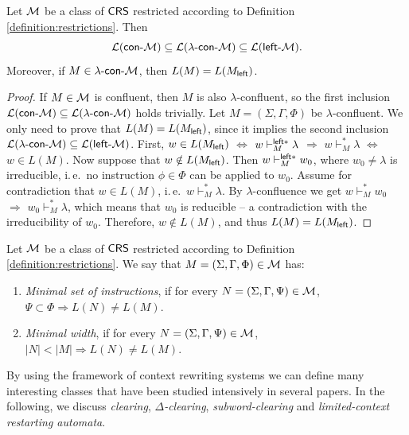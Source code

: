 \begin{lemma}\label{lemma:lambda}
Let $\textup{\sf $\mathcal{M}$}$ be a class of $\textup{\sf CRS\/}$ restricted according to Definition \ref{definition:restrictions}. Then $${\cal L}(\textup{\sf con-\textup{\sf $\mathcal{M}$}}) \subseteq {\cal L}(\textup{\sf $\lambda$-con-\textup{\sf $\mathcal{M}$}}) \subseteq {\cal L}(\textup{\sf left-\textup{\sf $\mathcal{M}$}}).$$
Moreover, if $M \in \textup{\sf $\lambda$-con-\textup{\sf $\mathcal{M}$}}$, then $L(M) = L(M_{\sf left})$.
\end{lemma}

\begin{proof}
If $M \in \textup{\sf $\mathcal{M}$}$ is confluent, then $M$ is also $\lambda$-confluent, so the first inclusion ${\cal L}(\textup{\sf con-\textup{\sf $\mathcal{M}$}}) \subseteq {\cal L}(\textup{\sf $\lambda$-con-\textup{\sf $\mathcal{M}$}})$ holds trivially. Let $M=(\Sigma, \Gamma, \Phi)$ be $\lambda$-confluent. We only need to prove that $L(M) = L(M_{\sf left})$, since it implies the second inclusion $ {\cal L}(\textup{\sf $\lambda$-con-\textup{\sf $\mathcal{M}$}}) \subseteq {\cal L}(\textup{\sf left-\textup{\sf $\mathcal{M}$}})$. First, $w \in L(M_{\sf left})$ $\Leftrightarrow$ $w \vdash^{{\sf left}*}_M \lambda$ $\Rightarrow$ $w \vdash_M^* \lambda$ $\Leftrightarrow$ $w \in L(M)$. Now suppose that $w \notin L(M_{\sf left})$. Then $w \vdash^{{\sf left}*}_M w_0$, where $w_0 \neq \lambda$ is irreducible, i.\,e.\ no instruction $\phi \in \Phi$ can be applied to $w_0$. Assume for contradiction that $w \in L(M)$, i.\,e.\ $w \vdash_M^* \lambda$. By $\lambda$-confluence we get $w \vdash_M^* w_0$ $\Rightarrow$ $w_0 \vdash_M^* \lambda$, which means that $w_0$ is reducible -- a contradiction with the irreducibility of $w_0$.
Therefore, $w \notin L(M)$, and thus $L(M) = L(M_{\sf left})$.
\end{proof}

\begin{definition}\label{definition:nf}
Let $\textup{\sf $\mathcal{M}$}$ be a class of $\textup{\sf CRS\/}$ restricted according to Definition \ref{definition:restrictions}. We say that $M = (\Sigma, \Gamma, \Phi) \in \textup{\sf $\mathcal{M}$}$ has:
\begin{enumerate}
\item \emph{Minimal set of instructions}, if for every $N = (\Sigma, \Gamma, \Psi) \in \textup{\sf $\mathcal{M}$}$, $\Psi \subset \Phi \Rightarrow L(N) \neq L(M)$.
\item \emph{Minimal width}, if for every $N = (\Sigma, \Gamma, \Psi) \in \textup{\sf $\mathcal{M}$}$, $|N| < |M| \Rightarrow L(N) \neq L(M)$.
\end{enumerate}
\end{definition}

By using the framework of context rewriting systems we can define many interesting classes that have been studied intensively in several papers. In the following, we discuss \emph{clearing}, \emph{$\Delta$-clearing}, \emph{subword-clearing} and \emph{limited-context restarting automata}.

